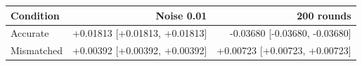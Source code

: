 \begin{tabular}{lrr}
\toprule
Condition & Noise 0.01 & 200 rounds \\
\midrule
Accurate & +0.01813 [+0.01813, +0.01813] & -0.03680 [-0.03680, -0.03680] \\
Mismatched & +0.00392 [+0.00392, +0.00392] & +0.00723 [+0.00723, +0.00723] \\
\bottomrule
\end{tabular}

